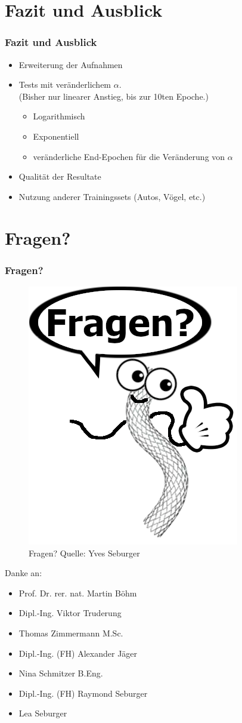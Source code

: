 \documentclass{beamer}
\begin{document}
\section{Fazit und Ausblick}
\begin{frame}
\frametitle{Fazit und Ausblick}
\begin{itemize}
    \item Erweiterung der Aufnahmen
    \item Tests mit veränderlichem $\alpha$. \\
    \small{(Bisher nur linearer Anstieg, bis zur 10ten Epoche.)}
    \begin{itemize}
        \item Logarithmisch
        \item Exponentiell
        \item veränderliche End-Epochen für die Veränderung von $\alpha$
    \end{itemize}
    \item Qualität der Resultate
    \item Nutzung anderer Trainingssets (Autos, Vögel, etc.)
\end{itemize}
\end{frame}

\section{Fragen?}
\begin{frame}[allowframebreaks]
    \frametitle{Fragen?}    
    \begin{figure}
        \includegraphics[width=0.45\linewidth]{Bilder/Happy Stent.png}
        \caption{Fragen? \scriptsize{Quelle: Yves Seburger}}
    \end{figure}
    \framebreak
    Danke an:
    \begin{itemize}
        \item Prof. Dr. rer. nat. Martin Böhm
        \item Dipl.-Ing. Viktor Truderung
        \item Thomas Zimmermann M.Sc.
        \item Dipl.-Ing. (FH) Alexander Jäger
        \item Nina Schmitzer B.Eng.
        \item Dipl.-Ing. (FH) Raymond Seburger
        \item Lea Seburger
    \end{itemize} 
\end{frame}
\end{document}
